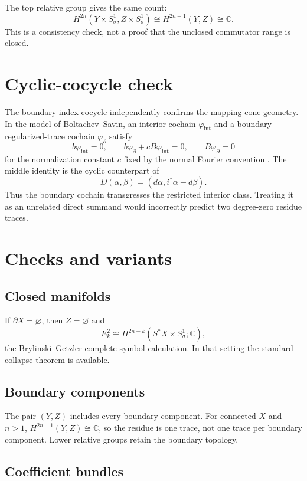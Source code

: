 \documentclass[11pt,oneside,reqno]{article}
\newcommand{\C}{\mathbb C}
\theoremstyle{plain}
\theoremstyle{definition}
\theoremstyle{remark}
\begin{document}
The top relative group gives the same count:
\[
 H^{2n}(Y\times S^1_\sigma,Z\times S^1_\sigma)
 \cong H^{2n-1}(Y,Z)\cong\C.
\]
This is a consistency check, not a proof that the unclosed commutator range
is closed.

\section{Cyclic-cocycle check}

The boundary index cocycle independently confirms the mapping-cone geometry.
In the model of Boltachev--Savin, an interior cochain
\(\varphi_{\mathrm{int}}\) and a boundary regularized-trace cochain
\(\varphi_\partial\) satisfy
\[
 b\varphi_{\mathrm{int}}=0,\qquad
 b\varphi_\partial+cB\varphi_{\mathrm{int}}=0,\qquad
 B\varphi_\partial=0
\]
for the normalization constant \(c\) fixed by the normal Fourier convention
\cite{BoltachevSavin}. The middle identity is the cyclic counterpart of
\[
 D(\alpha,\beta)=(d\alpha,i^*\alpha-d\beta).
\]
Thus the boundary cochain transgresses the restricted interior class.
Treating it as an unrelated direct summand would incorrectly predict two
degree-zero residue traces.

\section{Checks and variants}

\subsection{Closed manifolds}

If \(\partial X=\varnothing\), then \(Z=\varnothing\) and
\[
 E^2_k\cong H^{2n-k}(S^*X\times S^1_\sigma;\C),
\]
the Brylinski--Getzler complete-symbol calculation. In that setting the
standard collapse theorem is available.

\subsection{Boundary components}

The pair \((Y,Z)\) includes every boundary component. For connected \(X\)
and \(n>1\), \(H^{2n-1}(Y,Z)\cong\C\), so the residue is one trace, not one
trace per boundary component. Lower relative groups retain the boundary
topology.

\subsection{Coefficient bundles}
\end{document}

